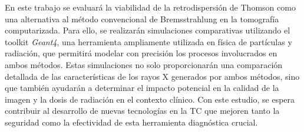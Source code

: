 En este trabajo se evaluará la viabilidad de la retrodispersión de Thomson como una alternativa al método convencional de Bremsstrahlung en la tomografía computarizada. Para ello, se realizarán simulaciones comparativas utilizando el toolkit \textit{Geant4}, una herramienta ampliamente utilizada en física de partículas y radiación, que permitirá modelar con precisión los procesos involucrados en ambos métodos. Estas simulaciones no solo proporcionarán una comparación detallada de las características de los rayos X generados por ambos métodos, sino que también ayudarán a determinar el impacto potencial en la calidad de la imagen y la dosis de radiación en el contexto clínico. Con este estudio, se espera contribuir al desarrollo de nuevas tecnologías en la TC que mejoren tanto la seguridad como la efectividad de esta herramienta diagnóstica crucial.


\vspace*{\fill}